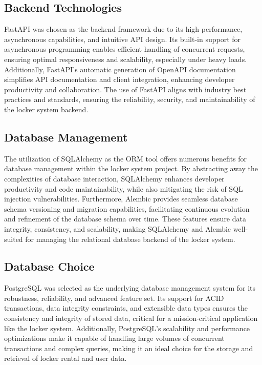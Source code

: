 \subsection{Backend Technologies}

FastAPI was chosen as the backend framework due to its high performance,
asynchronous capabilities, and intuitive API design. Its built-in support for
asynchronous programming enables efficient handling of concurrent requests,
ensuring optimal responsiveness and scalability, especially under heavy loads.
Additionally, FastAPI's automatic generation of OpenAPI documentation simplifies
API documentation and client integration, enhancing developer productivity and collaboration.
The use of FastAPI aligns with industry best practices and standards, ensuring the reliability,
security, and maintainability of the locker system backend.

\subsection{Database Management}

The utilization of SQLAlchemy as the ORM tool offers numerous benefits for database management
within the locker system project. By abstracting away the complexities of database interaction,
SQLAlchemy enhances developer productivity and code maintainability,
while also mitigating the risk of SQL injection vulnerabilities. Furthermore,
Alembic provides seamless database schema versioning and migration capabilities,
facilitating continuous evolution and refinement of the database schema over time.
These features ensure data integrity, consistency, and scalability, making SQLAlchemy
and Alembic well-suited for managing the relational database backend of the locker system.

\subsection{Database Choice}

PostgreSQL was selected as the underlying database management system for its robustness,
reliability, and advanced feature set. Its support for ACID transactions,
data integrity constraints, and extensible data types ensures the consistency and
integrity of stored data, critical for a mission-critical application like the locker system.
Additionally, PostgreSQL's scalability and performance optimizations make it capable
of handling large volumes of concurrent transactions and complex queries, making it an ideal
choice for the storage and retrieval of locker rental and user data.

